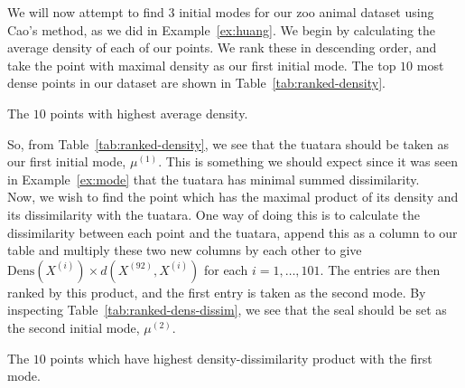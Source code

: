 \begin{example}\label{ex:cao}
    We will now attempt to find \(3\) initial modes for our zoo animal dataset 
    using Cao's method, as we did in Example~\ref{ex:huang}. We begin by 
    calculating the average density of each of our points. We rank these in 
    descending order, and take the point with maximal density as our first 
    initial mode. The top \(10\) most dense points in our dataset are shown in
    Table~\ref{tab:ranked-density}.

    \begin{table}[H]
    \resizebox{\textwidth}{!}{%
        
    }
    \caption{The \(10\) points with highest average density.}\label{%
    tab:ranked-density}
    \end{table}

    So, from Table~\ref{tab:ranked-density}, we see that the tuatara should be
    taken as our first initial mode, \(\mu^{(1)}\). This is something we should
    expect since it was seen in Example~\ref{ex:mode} that the tuatara has
    minimal summed dissimilarity.\\
    
    Now, we wish to find the point which has the maximal product of its density
    and its dissimilarity with the tuatara. One way of doing this is to 
    calculate the dissimilarity between each point and the tuatara, append this
    as a column to our table and multiply these two new columns by each other
    to give \(\text{Dens}(X^{(i)}) \times d(X^{(92)}, X^{(i)})\) for each \(i =
    1, \ldots, 101\). The entries are then ranked by this product, and the first
    entry is taken as the second mode. By inspecting 
    Table~\ref{tab:ranked-dens-dissim}, we see that the seal should be set as
    the second initial mode, \(\mu^{(2)}\).\\

    \begin{table}[H]
    \resizebox{\textwidth}{!}{%
        
    }
    \caption{The \(10\) points which have highest density-dissimilarity product
    with the first mode.}\label{tab:ranked-dens-dissim}
    \end{table}


\end{example}
